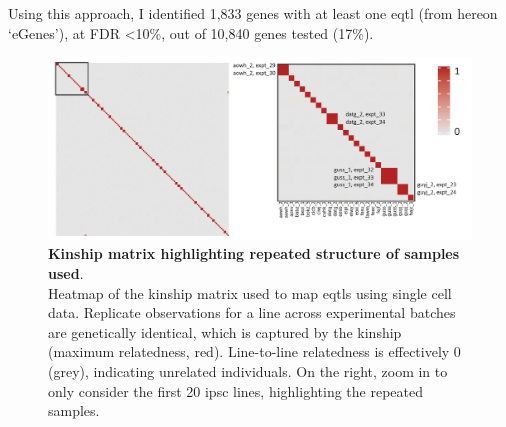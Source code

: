 Using this approach, I identified 1,833 genes with at least one \gls{eqtl} (from hereon `eGenes'), at FDR <10\%, out of 10,840 genes tested (17\%). 

\begin{figure}[h]
\centering
\includegraphics[width=14.5cm]{Chapter3/Fig/kinship_repeatedness.png}
\caption[Kinship for repeated samples]{\textbf{Kinship matrix highlighting repeated structure of samples used}.\\
Heatmap of the kinship matrix used to map \glspl{eqtl} using single cell data.
Replicate observations for a line across experimental batches are genetically identical, which is captured by the kinship (maximum relatedness, red).
Line-to-line relatedness is effectively 0 (grey), indicating unrelated individuals. 
On the right, zoom in to only consider the first 20 \gls{ipsc} lines, highlighting the repeated samples.}
\label{fig:kinship_repeats}
\end{figure}








